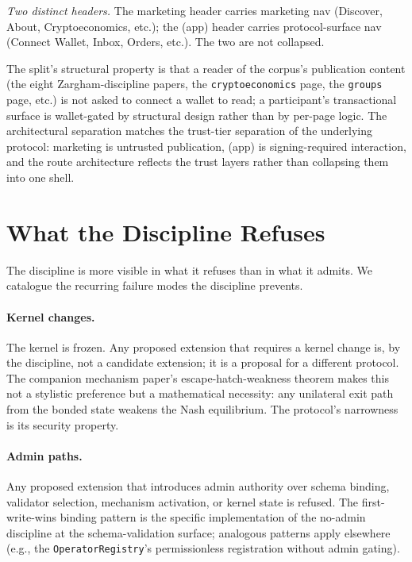 \documentclass[11pt,a4paper]{article}
\theoremstyle{definition}
\theoremstyle{remark}
\begin{document}
\emph{Two distinct headers.} The marketing header carries marketing
nav (Discover, About, Cryptoeconomics, etc.); the (app) header
carries protocol-surface nav (Connect Wallet, Inbox, Orders, etc.).
The two are not collapsed.

The split's structural property is that a reader of the corpus's
publication content (the eight Zargham-discipline papers, the
\texttt{cryptoeconomics} page, the \texttt{groups} page, etc.) is
not asked to connect a wallet to read; a participant's
transactional surface is wallet-gated by structural design rather
than by per-page logic. The architectural separation matches the
trust-tier separation of the underlying protocol: marketing is
untrusted publication, (app) is signing-required interaction, and
the route architecture reflects the trust layers rather than
collapsing them into one shell.

\section{What the Discipline Refuses}
\label{sec:refusals}

The discipline is more visible in what it refuses than in what it
admits. We catalogue the recurring failure modes the discipline
prevents.

\paragraph{Kernel changes.}
The kernel is frozen. Any proposed extension that requires a kernel
change is, by the discipline, not a candidate extension; it is a
proposal for a different protocol. The companion mechanism paper's
escape-hatch-weakness theorem makes this not a stylistic preference
but a mathematical necessity: any unilateral exit path from the
bonded state weakens the Nash equilibrium. The protocol's
narrowness is its security property.

\paragraph{Admin paths.}
Any proposed extension that introduces admin authority over schema
binding, validator selection, mechanism activation, or kernel
state is refused. The first-write-wins binding pattern is the
specific implementation of the no-admin discipline at the
schema-validation surface; analogous patterns apply elsewhere
(e.g., the \texttt{OperatorRegistry}'s permissionless registration
without admin gating).
\end{document}
